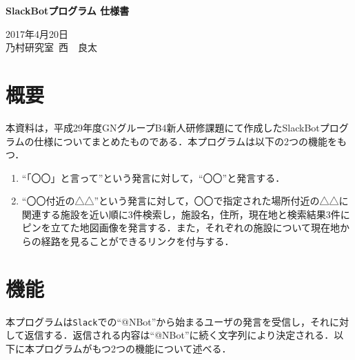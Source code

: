 \documentclass[fleqn, 14pt]{extarticlej}
\begin{document}
\begin{center}
{\Large {\bf SlackBotプログラム 仕様書}}

\end{center}

\begin{flushright}
  2017年4月20日\\
  
  乃村研究室\ 西　良太
\end{flushright}

\section{概要}
本資料は，平成29年度GNグループB4新人研修課題にて作成したSlackBotプログラムの仕様についてまとめたものである．本プログラムは以下の2つの機能をもつ．

\begin{enumerate}
\item ``「〇〇」と言って''という発言に対して，``〇〇''と発言する．
\item ``〇〇付近の△△''という発言に対して，〇〇で指定された場所付近の△△に関連する施設を近い順に3件検索し，施設名，住所，現在地と検索結果3件にピンを立てた地図画像を発言する．また，それぞれの施設について現在地からの経路を見ることができるリンクを付与する．
\end{enumerate}

\section{機能}
本プログラムは\verb|Slack|での``@NBot''から始まるユーザの発言を受信し，それに対して返信する．返信される内容は``@NBot''に続く文字列により決定される．以下に本プログラムがもつ2つの機能について述べる．
\end{document}
